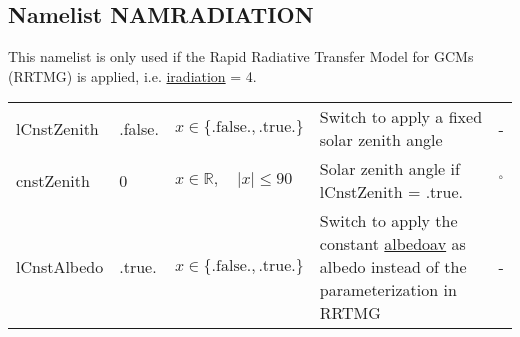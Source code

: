 \documentclass[twoside,11pt,fleqn,a4paper,english,openright]{report}
\begin{document}
\newpage
\subsection{Namelist NAMRADIATION}\label{par:radiation}
This namelist is only used if the Rapid Radiative Transfer Model for GCMs (RRTMG) is applied, i.e.  \hyperlink{iradiation}{iradiation} = 4.
\begin{center}
  \tablelasttail{
        &&&&\\\hline
  }
\begin{supertabular}{|l|p{2cm}|p{4cm}|p{6cm}|l|}
   lCnstZenith	&	.false.	& $x\in\{\text{.false.},\text{.true.}\}$	& Switch to apply a fixed solar zenith angle	& -\\
   cnstZenith	&	0	& $x \in \mathbb{R}, \quad \vert x\vert \leq 90 $	& Solar zenith angle if lCnstZenith = .true.	& $^{\circ}$\\
   lCnstAlbedo	&	.true.	& $x\in\{\text{.false.},\text{.true.}\}$	& Switch to apply the constant \hyperlink{albedo}{albedoav} as albedo instead of the parameterization in RRTMG	& -\\

\end{supertabular}
\end{center}
\end{document}
